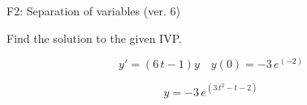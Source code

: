 \begin{exercise}
  \begin{exerciseTitle}F2: Separation of variables (ver. 6)\end{exerciseTitle}
  \begin{exerciseStatement}
    
Find the solution to the given IVP.

    
\[y'=( 6 \, t - 1 )y\hspace{1em} y(0)= -3 \, e^{\left(-2\right)}\]

  \end{exerciseStatement}
  \begin{exerciseAnswer}
    
\[y= -3 \, e^{\left(3 \, t^{2} - t - 2\right)}\]

  \end{exerciseAnswer}
\end{exercise}